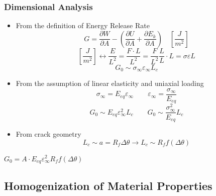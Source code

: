 \documentclass[first,firstsupp,lastsupp,last,hyperref,table]{ETHclass}
\begin{document}
\begin{frame}
\frametitle{\vspace{0.3cm}\small Dimensional Analysis}
\vspace{-0.75cm}
\centering
\tiny
\begin{itemize}[label=]
\item From the definition of Energy Release Rate
\begin{equation*}
G=\frac{\partial W}{\partial A} - \left(\frac{\partial U}{\partial A}+\frac{\partial E_{k}}{\partial A}\right)\quad\left[\frac{J}{m^{2}}\right]
\end{equation*}
\begin{equation*}
\left[\frac{J}{m^{2}}\right]\longleftrightarrow\frac{E}{L^{2}}=\frac{F\cdot L}{L^{2}}=\frac{F}{L^{2}}\frac{L}{L}\cdot L=\sigma\varepsilon L
\end{equation*}
\begin{equation*}
G_{0}\sim\sigma_{\infty}\varepsilon_{\infty} L_{c}
\end{equation*}
\item From the assumption of linear elasticity and uniaxial loading
\begin{equation*}
\sigma_{\infty}=E_{eq}\varepsilon_{\infty}\qquad\varepsilon_{\infty}=\frac{\sigma_{\infty}}{E_{eq}}
\end{equation*}
\begin{equation*}
G_{0}\sim E_{eq}\varepsilon^{2}_{\infty}L_{c}\qquad G_{0}\sim\frac{\sigma^{2}_{\infty}}{E_{eq}}L_{c}
\end{equation*}
\item From crack geometry
\begin{equation*}
L_{c}\sim a=R_{f}\Delta\theta\longrightarrow L_{c}\sim R_{f}f\left(\Delta\theta\right)
\end{equation*}
\end{itemize}
\vspace{-0.25cm}
\begin{alertblock}{\scriptsize\centering$G_{0}=A\cdot E_{eq}\varepsilon^{2}_{\infty}R_{f}f\left(\Delta\theta\right)$}
\end{alertblock}
\end{frame}

\subsection[Homogenization]{Homogenization of Material Properties}
\end{document}
